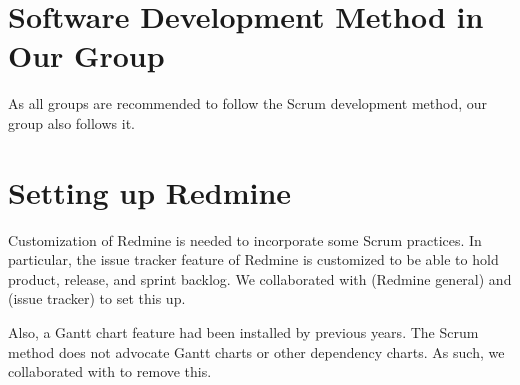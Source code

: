 \section{Software Development Method in Our Group}
As all groups are recommended to follow the Scrum development method, our group also follows it.

\section{Setting up Redmine}

Customization of Redmine is needed to incorporate some Scrum practices. In particular, the issue tracker feature of Redmine is customized to be able to hold product, release, and sprint backlog. We collaborated with  (Redmine general) and  (issue tracker) to set this up. 

Also, a Gantt chart feature had been installed by previous years. The Scrum method does not advocate Gantt charts or other dependency charts. As such, we collaborated with  to remove this.
